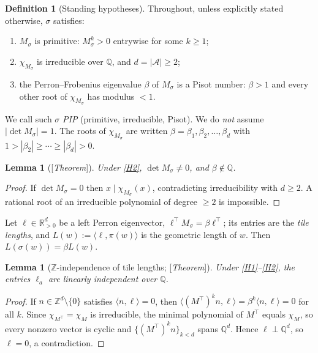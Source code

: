 \documentclass[11pt]{amsart}
\theoremstyle{plain}
\newtheorem{lemma}[theorem]{Lemma}
\theoremstyle{definition}
\newtheorem{definition}[theorem]{Definition}
\theoremstyle{remark}
\newcommand{\Z}{\mathbb{Z}}
\newcommand{\Q}{\mathbb{Q}}
\newcommand{\R}{\mathbb{R}}
\newcommand{\A}{\mathcal{A}}
\newcommand{\Status}[1]{\textup{[\textit{#1}]}}
\begin{document}
\begin{definition}[Standing hypotheses]\label{def:standing}
Throughout, unless explicitly stated otherwise, $\sigma$ satisfies:
\begin{enumerate}[label=(H\arabic*)]
\item\label{H1} $M_\sigma$ is primitive: $M_\sigma^k>0$ entrywise for some $k\ge1$;
\item\label{H2} $\chi_{M_\sigma}$ is irreducible over $\Q$, and $d=|\A|\ge 2$;
\item\label{H3} the Perron--Frobenius eigenvalue $\beta$ of $M_\sigma$ is a Pisot number: $\beta>1$ and every other root of $\chi_{M_\sigma}$ has modulus $<1$.
\end{enumerate}
We call such $\sigma$ \emph{PIP} (primitive, irreducible, Pisot). We do \emph{not} assume $|\det M_\sigma|=1$. The roots of $\chi_{M_\sigma}$ are written $\beta=\beta_1,\beta_2,\dots,\beta_d$ with $1>|\beta_2|\ge\cdots\ge|\beta_d|>0$.
\end{definition}

\begin{lemma}[\Status{Theorem}]\label{lem:det}
Under \ref{H2}, $\det M_\sigma\ne0$, and $\beta\notin\Q$.
\end{lemma}
\begin{proof}
If $\det M_\sigma=0$ then $x\mid\chi_{M_\sigma}(x)$, contradicting irreducibility with $d\ge2$. A rational root of an irreducible polynomial of degree $\ge2$ is impossible.
\end{proof}

Let $\ell\in\R^d_{>0}$ be a left Perron eigenvector, $\ell^{\top}M_\sigma=\beta\ell^{\top}$; its entries are the \emph{tile lengths}, and $L(w):=\langle\ell,\pi(w)\rangle$ is the geometric length of $w$. Then $L(\sigma(w))=\beta L(w)$.

\begin{lemma}[$\Z$-independence of tile lengths; \Status{Theorem}]\label{lem:Zindep}
Under \ref{H1}--\ref{H2}, the entries $\ell_a$ are linearly independent over $\Q$.
\end{lemma}
\begin{proof}
If $n\in\Z^d\setminus\{0\}$ satisfies $\langle n,\ell\rangle=0$, then $\langle (M^{\top})^kn,\ell\rangle=\beta^k\langle n,\ell\rangle=0$ for all $k$. Since $\chi_{M^\top}=\chi_M$ is irreducible, the minimal polynomial of $M^\top$ equals $\chi_M$, so every nonzero vector is cyclic and $\{(M^\top)^kn\}_{k<d}$ spans $\Q^d$. Hence $\ell\perp\Q^d$, so $\ell=0$, a contradiction.
\end{proof}
\end{document}
